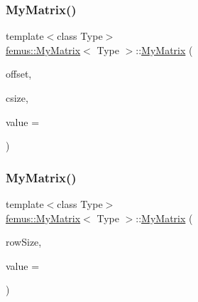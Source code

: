 \mbox{\label{classfemus_1_1_my_matrix_ad0294488e8e1fa7a5fd78a08ac23f677}} 
\subsubsection{\texorpdfstring{My\+Matrix()}{MyMatrix()}\hspace{0.1cm}{\footnotesize\ttfamily [3/4]}}
{\footnotesize\ttfamily template$<$class Type$>$ \\
\mbox{\hyperlink{classfemus_1_1_my_matrix}{femus\+::\+My\+Matrix}}$<$ Type $>$\+::\mbox{\hyperlink{classfemus_1_1_my_matrix}{My\+Matrix}} (\begin{DoxyParamCaption}\item[{const std\+::vector$<$ unsigned $>$ \&}]{offset,  }\item[{const unsigned \&}]{csize,  }\item[{const Type}]{value = {} }\end{DoxyParamCaption})}

\mbox{\label{classfemus_1_1_my_matrix_a44785815b941b7f42b029668c1641abe}} 
\subsubsection{\texorpdfstring{My\+Matrix()}{MyMatrix()}\hspace{0.1cm}{\footnotesize\ttfamily [4/4]}}
{\footnotesize\ttfamily template$<$class Type$>$ \\
\mbox{\hyperlink{classfemus_1_1_my_matrix}{femus\+::\+My\+Matrix}}$<$ Type $>$\+::\mbox{\hyperlink{classfemus_1_1_my_matrix}{My\+Matrix}} (\begin{DoxyParamCaption}\item[{const \mbox{\hyperlink{classfemus_1_1_my_vector}{My\+Vector}}$<$ unsigned $>$ \&}]{row\+Size,  }\item[{const Type}]{value = {} }\end{DoxyParamCaption})}

\mbox{\label{classfemus_1_1_my_matrix_af6027611ab36fc1826b9efa278cd6a23}} 
